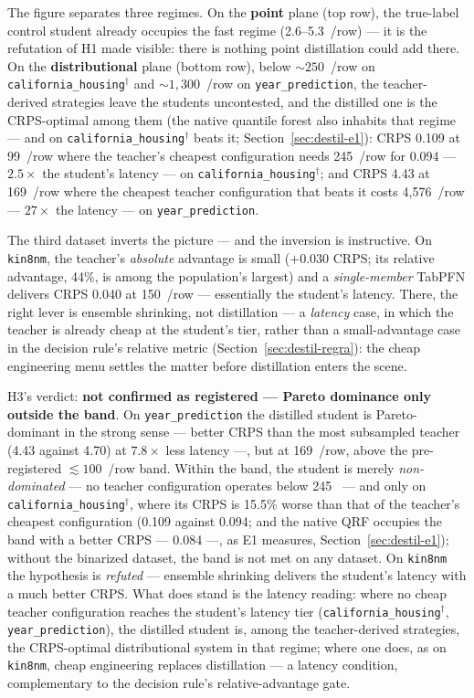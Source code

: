 The figure separates three regimes. On the \textbf{point} plane (top
row), the true-label control student already occupies the fast
regime (2.6--5.3~\us/row) --- it is the refutation of H1 made
visible: there is nothing point distillation could add there. On the
\textbf{distributional} plane (bottom row), below
${\sim}250$~\us/row on
\texttt{california\_\allowbreak housing}$^\dagger$ and
${\sim}1{,}300$~\us/row on \texttt{year\_\allowbreak prediction},
the teacher-derived strategies leave the students uncontested, and
the distilled one is the CRPS-optimal among them (the native quantile
forest also inhabits that regime --- and on
\texttt{california\_\allowbreak housing}$^\dagger$ beats it;
Section~\ref{sec:destil-e1}): CRPS 0.109 at 99~\us/row where the
teacher's cheapest configuration needs 245~\us/row for 0.094 ---
$2.5\times$ the student's latency --- on
\texttt{california\_\allowbreak housing}$^\dagger$; and CRPS 4.43 at
169~\us/row where the cheapest teacher configuration that beats it
costs 4{,}576~\us/row --- $27\times$ the latency --- on
\texttt{year\_\allowbreak prediction}.

The third dataset inverts the picture --- and the inversion is
instructive. On \texttt{kin8nm}, the teacher's \emph{absolute}
advantage is small ($+0.030$ CRPS; its relative advantage, 44\%, is
among the population's largest) and a \emph{single-member} TabPFN
delivers CRPS 0.040 at 150~\us/row --- essentially the student's
latency. There, the right lever is ensemble shrinking, not
distillation --- a \emph{latency} case, in which the teacher is
already cheap at the student's tier, rather than a small-advantage
case in the decision rule's relative metric
(Section~\ref{sec:destil-regra}): the cheap engineering menu settles
the matter before distillation enters the scene.

H3's verdict: \textbf{not confirmed as registered --- Pareto
dominance only outside the band}. On
\texttt{year\_\allowbreak prediction} the distilled student is
Pareto-dominant in the strong sense --- better CRPS than the most
subsampled teacher (4.43 against 4.70) at $7.8\times$ less latency
---, but at 169~\us/row, above the pre-registered
${\lesssim}100$~\us/row band. Within the band, the student is
merely \emph{non-dominated} --- no teacher configuration operates
below 245~\us{} --- and only on
\texttt{california\_\allowbreak housing}$^\dagger$, where its
CRPS is 15.5\% worse than that of the teacher's cheapest
configuration (0.109 against 0.094; and the native QRF occupies the
band with a better CRPS --- 0.084 ---, as E1 measures,
Section~\ref{sec:destil-e1}); without the binarized
dataset, the band is not met on any dataset. On \texttt{kin8nm} the
hypothesis is \emph{refuted} --- ensemble shrinking delivers the
student's latency with a much better CRPS. What does stand is the
latency reading: where no cheap teacher configuration reaches the
student's latency tier
(\texttt{california\_\allowbreak housing}$^\dagger$,
\texttt{year\_\allowbreak prediction}), the distilled student is,
among the teacher-derived strategies, the CRPS-optimal
distributional system in that regime; where one does, as on
\texttt{kin8nm}, cheap engineering replaces distillation --- a
latency condition, complementary to the decision rule's
relative-advantage gate.

